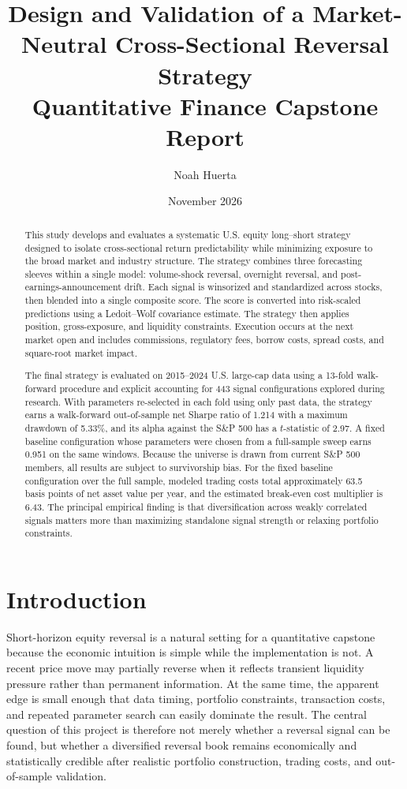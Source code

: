 \documentclass[11pt]{article}
\title{\textbf{Design and Validation of a Market-Neutral Cross-Sectional Reversal Strategy}\\[0.5em]
\large Quantitative Finance Capstone Report}
\author{Noah Huerta}
\date{November 2026}
\begin{document}
\maketitle

\begin{abstract}
This study develops and evaluates a systematic U.S. equity long--short strategy designed to isolate cross-sectional
return predictability while minimizing exposure to the broad market and industry structure. The strategy combines three
forecasting sleeves within a single model: volume-shock reversal, overnight reversal, and post-earnings-announcement
drift. Each signal is winsorized and standardized across stocks, then blended into a single composite
score. The score is converted into risk-scaled predictions using a Ledoit--Wolf covariance estimate. The strategy
then applies position, gross-exposure, and liquidity constraints. Execution occurs at the next market open and
includes commissions, regulatory fees, borrow costs, spread costs, and square-root market impact.

The final strategy is evaluated on 2015--2024 U.S. large-cap data using a 13-fold walk-forward procedure and explicit
accounting for 443 signal configurations explored during research. With parameters re-selected in each fold using only past data, the strategy earns a walk-forward out-of-sample net Sharpe ratio of 1.214 with a maximum drawdown of 5.33\%, and its alpha against the S\&P 500 has a $t$-statistic of 2.97. A fixed baseline configuration whose parameters were chosen from a full-sample sweep earns 0.951 on the same windows. Because the universe is
drawn from current S\&P 500 members, all results are subject to survivorship bias. For the fixed baseline configuration
over the full sample, modeled trading costs total approximately 63.5 basis points of net asset value per year, and the
estimated break-even cost multiplier is 6.43. The principal empirical finding is that diversification across weakly
correlated signals matters more than maximizing standalone signal strength or relaxing portfolio constraints.
\end{abstract}

\section{Introduction}

Short-horizon equity reversal is a natural setting for a quantitative capstone because the economic intuition is simple while the implementation is not. A recent price move may partially reverse when it reflects transient liquidity pressure rather than permanent information. At the same time, the apparent edge is small enough that data timing, portfolio constraints, transaction costs, and repeated parameter search can easily dominate the result. The central question of this project is therefore not merely whether a reversal signal can be found, but whether a diversified reversal book remains economically and statistically credible after realistic portfolio construction, trading costs, and out-of-sample validation.
\end{document}
